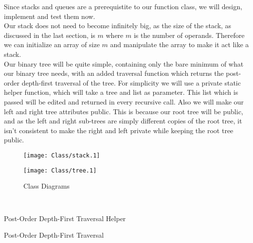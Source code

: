 \documentclass{article}
\newcounter{subsubsubsection}[subsubsection]
\begin{document}
\newpage
{}
Since stacks and queues are a prerequistite to our function class, we will design, implement and test them now.\\
Our stack does not need to become infinitely big, as the size of the stack, as discussed in the last section, is $m$ where $m$ is the number of operands. Therefore we can initialize an array of size $m$ and manipulate the array to make it act like a stack.\\
Our binary tree will be quite simple, containing only the bare minimum of what our binary tree needs, with an added traversal function which returns the post-order depth-first traversal of the tree. For simplicity we will use a private static helper function, which will take a tree and list as parameter. This list which is passed will be edited and returned in every recursive call. Also we will make our left and right tree attributes public. This is because our root tree will be public, and as the left and right sub-trees are simply different copies of the root tree, it isn't consistent to make the right and left private while keeping the root tree public.\\
\begin{figure}[h]
\centering
\begin{minipage}{.5\textwidth}
  \centering
  \texttt{[image: Class/stack.1]}
\end{minipage}%
\begin{minipage}{.5\textwidth}
  \centering
  \texttt{[image: Class/tree.1]}
\end{minipage}
\caption{Class Diagrams}
\end{figure}
\\
\begin{algorithm}[H]
\caption{Post-Order Depth-First Traversal Helper}
\DontPrintSemicolon
{}
\end{algorithm}
\begin{algorithm}[H]
\caption{Post-Order Depth-First Traversal}
\DontPrintSemicolon
{}
\end{algorithm}
\end{document}
